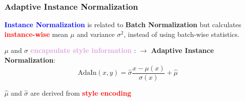 \documentclass[11pt,xcolor=dvipsnames]{beamer}
\begin{document}
\begin{frame}
\frametitle{Adaptive Instance Normalization}

\textbf{\textcolor{blue}{Instance Normalization}} is related to \textbf{Batch Normalization} but calculates \textbf{\textcolor{red}{instance-wise}} mean $\mu$ and variance $\sigma^2$, instead of using batch-wise statistics.

\vspace{10pt}

$\mu$ and $\sigma$ \textbf{\textcolor{Plum}{encapsulate style information}} \cite{adain}:
\vspace{10pt}
$\rightarrow$ \textbf{Adaptive Instance Normalization}:
\begin{equation*}
	\text{AdaIn}(x, y) = \hat{\sigma} \frac{x - \mu(x)}{\sigma(x)} + \hat{\mu}
\end{equation*}
\vspace{10pt}

$\hat{\mu}$ and $\hat{\sigma}$ are derived from \textbf{\textcolor{red}{style encoding}}

\end{frame}
\end{document}
